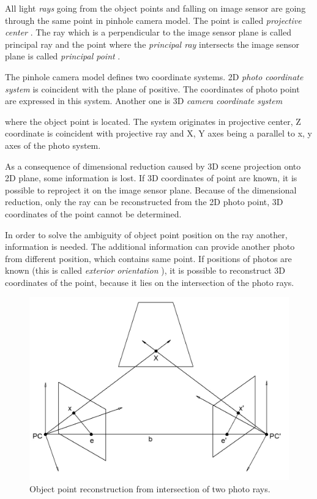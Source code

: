 \documentclass[a4paper,12pt]{article}
\newcommand{\term}[1]{
{\it #1}
}
\begin{document}

All light \term{rays} going from the object points and falling on image sensor are going through the same point in pinhole camera model.
The point is called \term{projective center}. The ray which is a perpendicular to the image sensor plane is called principal ray and the point 
where the \term{principal ray} intersects the image sensor plane is called \term{principal point}.

The pinhole camera model defines two coordinate systems. 2D  \term{photo coordinate system} is coincident
with the plane of positive.
The coordinates of photo point are expressed in this system. Another one is 3D \term{camera coordinate system}
where the object point is located. The system originates in projective center, Z coordinate 
 is coincident with projective ray and X, Y axes being a parallel to x, y axes of the photo system.

 
As a consequence of dimensional reduction caused by 
3D scene projection onto 2D plane, some information is lost.
If 3D coordinates of point are known, it is possible to reproject it on the image sensor plane. Because 
of the dimensional reduction,  only the ray can be reconstructed from the 2D photo point,
3D coordinates of the point cannot be determined.

In order to solve the ambiguity of object point position on the ray another, information is needed.  
The additional information can provide another photo from different position, which contains same point. 
If positions of photos 
 are known (this is called\term{ exterior orientation}), it is possible 
to reconstruct 3D coordinates of the point, because it lies on the intersection of the photo rays.


\begin{figure}[h]
    \centering
    \includegraphics[scale=0.2]{figures/object_point_intersection.png}
    \caption{Object point reconstruction from intersection of two photo rays.}
    \label{fig:obj_intersec}
\end{figure}
\end{document}
